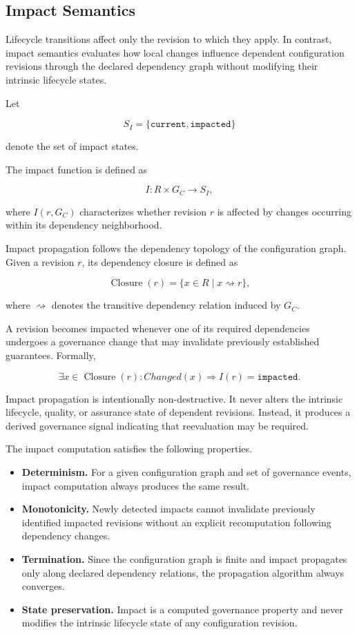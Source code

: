 \documentclass[10pt]{article}
\begin{document}
\subsection{Impact Semantics}
\label{sec:impact_semantics}

Lifecycle transitions affect only the revision to which they apply. In contrast, impact semantics evaluates how local changes influence dependent configuration revisions through the declared dependency graph without modifying their intrinsic lifecycle states.

Let

\[
S_I=
\{
\texttt{current},
\texttt{impacted}
\}
\]

denote the set of impact states.

The impact function is defined as

\[
I:R\times G_C\rightarrow S_I,
\]

where \(I(r,G_C)\) characterizes whether revision \(r\) is affected by changes occurring within its dependency neighborhood.

Impact propagation follows the dependency topology of the configuration graph. Given a revision \(r\), its dependency closure is defined as

\[
\operatorname{Closure}(r)
=
\{
x\in R
\mid
x
\rightsquigarrow
r
\},
\]

where \(\rightsquigarrow\) denotes the transitive dependency relation induced by \(G_C\).

A revision becomes impacted whenever one of its required dependencies undergoes a governance change that may invalidate previously established guarantees. Formally,

\[
\exists x\in
\operatorname{Closure}(r)
:
Changed(x)
\Longrightarrow
I(r)=\texttt{impacted}.
\]

Impact propagation is intentionally non-destructive. It never alters the intrinsic lifecycle, quality, or assurance state of dependent revisions. Instead, it produces a derived governance signal indicating that reevaluation may be required.

The impact computation satisfies the following properties.

\begin{itemize}
    \item \textbf{Determinism.}
    For a given configuration graph and set of governance events, impact computation always produces the same result.

    \item \textbf{Monotonicity.}
    Newly detected impacts cannot invalidate previously identified impacted revisions without an explicit recomputation following dependency changes.

    \item \textbf{Termination.}
    Since the configuration graph is finite and impact propagates only along declared dependency relations, the propagation algorithm always converges.

    \item \textbf{State preservation.}
    Impact is a computed governance property and never modifies the intrinsic lifecycle state of any configuration revision.
\end{itemize}
\end{document}
